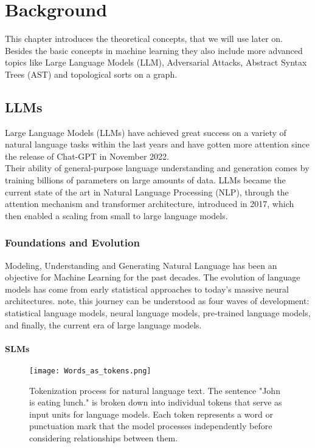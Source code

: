 \documentclass[%
thesis=student,%
coverpage=false,%
titlepage=false,%
headmarks=true, %
english,%
font=libertine, %
math=newpxtx, %
BCOR=5mm,%
coverBCOR=11mm%
]{tum-templates/book/tumbook}
\begin{document}
\chapter{Background}

This chapter introduces the theoretical concepts, that we will use later on. Besides the basic concepts in machine learning they also include more advanced topics like Large Language Models (LLM), Adversarial Attacks, Abstract Syntax Trees (AST) and topological sorts on a graph.

\section{LLMs}

Large Language Models (LLMs) have achieved great success on a variety of natural language tasks within the last years and have gotten more attention since the release of Chat-GPT in November 2022. \cite{OpenAI2022} \\
Their ability of general-purpose language understanding and generation comes by training billions of parameters on large amounts of data. LLMs became the current state of the art in Natural Language Processing (NLP), through the attention mechanism and transformer architecture, introduced in 2017, which then enabled a scaling from small to large language models. 

\subsection{Foundations and Evolution}

Modeling, Understanding and Generating Natural Language has been an objective for Machine Learning for the past decades. 
The evolution of language models has come from early statistical approaches to today's massive neural architectures. \textcite{Minaee2025} note, this journey can be understood as four waves of development: statistical language models, neural language models, pre-trained language models, and finally, the current era of large language models. 

\subsubsection{SLMs}

\begin{figure}[htbp]
    \centering
    \texttt{[image: Words\_as\_tokens.png]}
    \caption{Tokenization process for natural language text. The sentence "John is eating lunch." is broken down into individual tokens that serve as input units for language models. Each token represents a word or punctuation mark that the model processes independently before considering relationships between them.}
    \label{fig:Words_as_tokens}
    \cite{Günnemann2023}
\end{figure}
\end{document}
